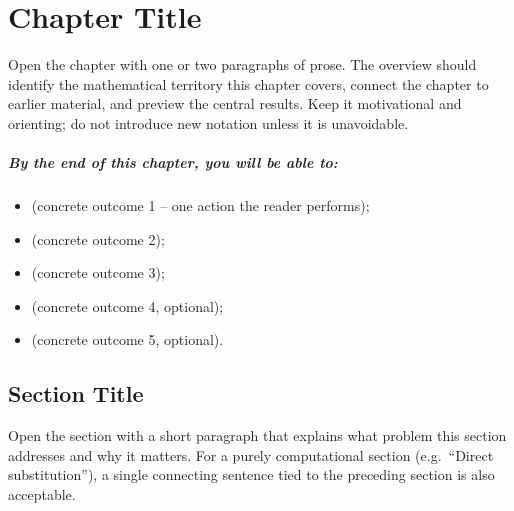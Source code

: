 
\chapter{Chapter Title}

Open the chapter with one or two paragraphs of prose. The overview should
identify the mathematical territory this chapter covers, connect the chapter
to earlier material, and preview the central results. Keep it motivational
and orienting; do not introduce new notation unless it is unavoidable.


\paragraph{By the end of this chapter, you will be able to:}
\begin{itemize}
    \item (concrete outcome 1 -- one action the reader performs);
    \item (concrete outcome 2);
    \item (concrete outcome 3);
    \item (concrete outcome 4, optional);
    \item (concrete outcome 5, optional).
\end{itemize}

\section{Section Title}

Open the section with a short paragraph that explains what problem this
section addresses and why it matters. For a purely computational section
(e.g.\ ``Direct substitution''), a single connecting sentence tied to the
preceding section is also acceptable.

